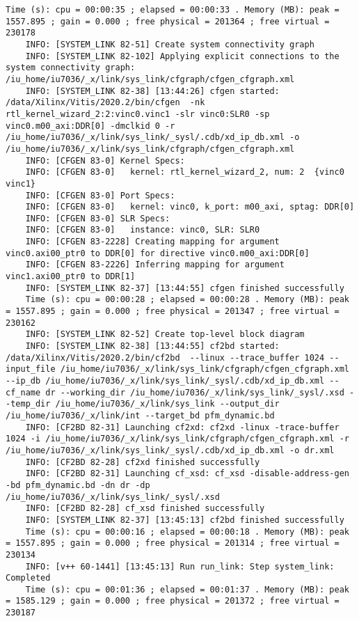 \begin{lstlisting}[caption=Содержимое файла v++\_vinc.log, label={log1}]
	Time (s): cpu = 00:00:35 ; elapsed = 00:00:33 . Memory (MB): peak = 1557.895 ; gain = 0.000 ; free physical = 201364 ; free virtual = 230178
	INFO: [SYSTEM_LINK 82-51] Create system connectivity graph
	INFO: [SYSTEM_LINK 82-102] Applying explicit connections to the system connectivity graph: /iu_home/iu7036/_x/link/sys_link/cfgraph/cfgen_cfgraph.xml
	INFO: [SYSTEM_LINK 82-38] [13:44:26] cfgen started: /data/Xilinx/Vitis/2020.2/bin/cfgen  -nk rtl_kernel_wizard_2:2:vinc0.vinc1 -slr vinc0:SLR0 -sp vinc0.m00_axi:DDR[0] -dmclkid 0 -r /iu_home/iu7036/_x/link/sys_link/_sysl/.cdb/xd_ip_db.xml -o /iu_home/iu7036/_x/link/sys_link/cfgraph/cfgen_cfgraph.xml
	INFO: [CFGEN 83-0] Kernel Specs: 
	INFO: [CFGEN 83-0]   kernel: rtl_kernel_wizard_2, num: 2  {vinc0 vinc1}
	INFO: [CFGEN 83-0] Port Specs: 
	INFO: [CFGEN 83-0]   kernel: vinc0, k_port: m00_axi, sptag: DDR[0]
	INFO: [CFGEN 83-0] SLR Specs: 
	INFO: [CFGEN 83-0]   instance: vinc0, SLR: SLR0
	INFO: [CFGEN 83-2228] Creating mapping for argument vinc0.axi00_ptr0 to DDR[0] for directive vinc0.m00_axi:DDR[0]
	INFO: [CFGEN 83-2226] Inferring mapping for argument vinc1.axi00_ptr0 to DDR[1]
	INFO: [SYSTEM_LINK 82-37] [13:44:55] cfgen finished successfully
	Time (s): cpu = 00:00:28 ; elapsed = 00:00:28 . Memory (MB): peak = 1557.895 ; gain = 0.000 ; free physical = 201347 ; free virtual = 230162
	INFO: [SYSTEM_LINK 82-52] Create top-level block diagram
	INFO: [SYSTEM_LINK 82-38] [13:44:55] cf2bd started: /data/Xilinx/Vitis/2020.2/bin/cf2bd  --linux --trace_buffer 1024 --input_file /iu_home/iu7036/_x/link/sys_link/cfgraph/cfgen_cfgraph.xml --ip_db /iu_home/iu7036/_x/link/sys_link/_sysl/.cdb/xd_ip_db.xml --cf_name dr --working_dir /iu_home/iu7036/_x/link/sys_link/_sysl/.xsd --temp_dir /iu_home/iu7036/_x/link/sys_link --output_dir /iu_home/iu7036/_x/link/int --target_bd pfm_dynamic.bd
	INFO: [CF2BD 82-31] Launching cf2xd: cf2xd -linux -trace-buffer 1024 -i /iu_home/iu7036/_x/link/sys_link/cfgraph/cfgen_cfgraph.xml -r /iu_home/iu7036/_x/link/sys_link/_sysl/.cdb/xd_ip_db.xml -o dr.xml
	INFO: [CF2BD 82-28] cf2xd finished successfully
	INFO: [CF2BD 82-31] Launching cf_xsd: cf_xsd -disable-address-gen -bd pfm_dynamic.bd -dn dr -dp /iu_home/iu7036/_x/link/sys_link/_sysl/.xsd
	INFO: [CF2BD 82-28] cf_xsd finished successfully
	INFO: [SYSTEM_LINK 82-37] [13:45:13] cf2bd finished successfully
	Time (s): cpu = 00:00:16 ; elapsed = 00:00:18 . Memory (MB): peak = 1557.895 ; gain = 0.000 ; free physical = 201314 ; free virtual = 230134
	INFO: [v++ 60-1441] [13:45:13] Run run_link: Step system_link: Completed
	Time (s): cpu = 00:01:36 ; elapsed = 00:01:37 . Memory (MB): peak = 1585.129 ; gain = 0.000 ; free physical = 201372 ; free virtual = 230187

\end{lstlisting}
